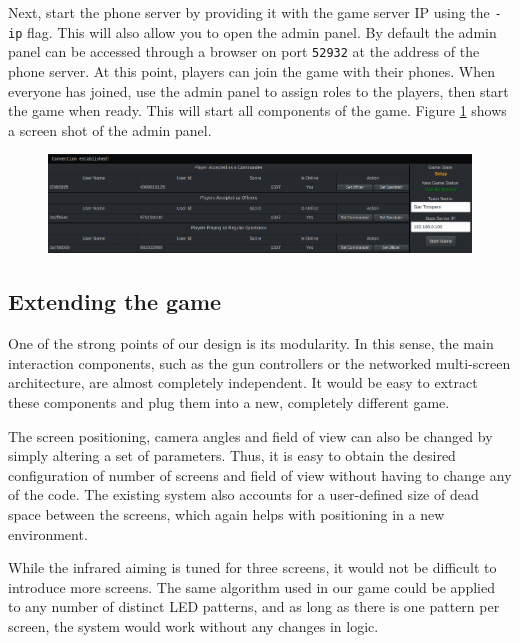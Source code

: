 \documentclass[a4paper,11pt]{article}
\begin{document}
Next, start the phone server by providing it with the game server IP using the \texttt{-ip} flag. This will also allow you to open the admin panel. By default the admin panel can be accessed through a browser on port \texttt{52932} at the address of the phone server. At this point, players can join the game with their phones. When everyone has joined, use the admin panel to assign roles to the players, then start the game when ready. This will start all components of the game. Figure \ref{fig:admin_panel} shows a screen shot of the admin panel.

\begin{figure}[ht]
	\centering
	\includegraphics[width=\textwidth]{admin_panel_cropped}
    \label{fig:admin_panel}
\end{figure}

\subsection{Extending the game}
One of the strong points of our design is its modularity. In this sense, the main interaction components, such as the gun controllers or the networked multi-screen architecture, are almost completely independent. It would be easy to extract these components and plug them into a new, completely different game.

The screen positioning, camera angles and field of view can also be changed by simply altering a set of parameters. Thus, it is easy to obtain the desired configuration of number of screens and field of view without having to change any of the code. The existing system also accounts for a user-defined size of dead space between the screens, which again helps with positioning in a new environment.

While the infrared aiming is tuned for three screens, it would not be difficult to introduce more screens. The same algorithm used in our game could be applied to any number of distinct LED patterns, and as long as there is one pattern per screen, the system would work without any changes in logic.
\end{document}

